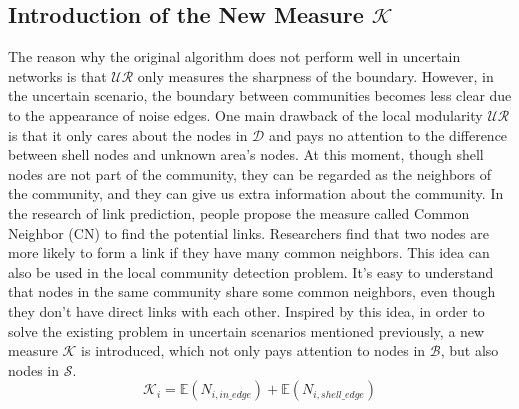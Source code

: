 \documentclass[\main/thesis.tex]{subfiles}
\begin{document}
\subsection{Introduction of the New Measure $\mathcal{K}$}
The reason why the original algorithm does not perform well in uncertain networks is that $\mathcal{UR}$ only measures the sharpness of the boundary. However, in the uncertain scenario, the boundary between communities becomes less clear due to the appearance of noise edges. One main drawback of the local modularity $\mathcal{UR}$ is that it only cares about the nodes in $\mathcal{D}$ and pays no attention to the difference between shell nodes and unknown area's nodes. At this moment, though shell nodes are not part of the community, they can be regarded as the neighbors of the community, and they can give us extra information about the community. In the research of link prediction, people propose the measure called Common Neighbor (CN) to find the potential links. Researchers find that two nodes are more likely to form a link if they have many common neighbors. This idea can also be used in the local community detection problem. It's easy to understand that nodes in the same community share some common neighbors, even though they don't have direct links with each other. Inspired by this idea, in order to solve the existing problem in uncertain scenarios mentioned previously, a new measure $\mathcal{K}$ is introduced, which not only pays attention to nodes in $\mathcal{B}$, but also nodes in $\mathcal{S}$.
\begin{equation}
\mathcal{K}_i = \mathbb{E}(N_{i,in\_edge}) + \mathbb{E}(N_{i,shell\_edge})
\end{equation}
\end{document}
